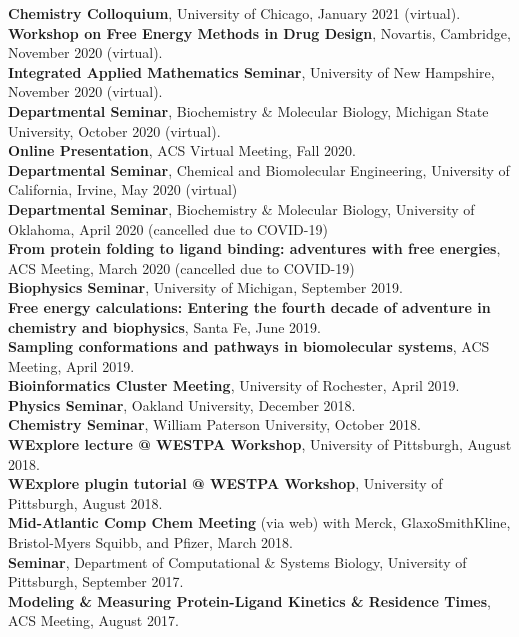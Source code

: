\documentclass[margin,line]{res}
\begin{document}
\begin{resume}
{\bf Chemistry Colloquium}, University of Chicago, January 2021 (virtual).\\
{\bf Workshop on Free Energy Methods in Drug Design}, Novartis, Cambridge, November 2020 (virtual).\\
{\bf Integrated Applied Mathematics Seminar}, University of New Hampshire, November 2020 (virtual).\\
{\bf Departmental Seminar}, Biochemistry \& Molecular Biology, Michigan State University, October 2020 (virtual).\\
{\bf Online Presentation}, ACS Virtual Meeting, Fall 2020.\\
{\bf Departmental Seminar}, Chemical and Biomolecular Engineering, University of California, Irvine, May 2020 (virtual) \\
{\bf Departmental Seminar}, Biochemistry \& Molecular Biology, University of Oklahoma, April 2020 (cancelled due to COVID-19) \\
{\bf From protein folding to ligand binding: adventures with free energies}, ACS Meeting, March 2020 (cancelled due to COVID-19) \\
{\bf Biophysics Seminar}, University of Michigan, September 2019.\\
{\bf Free energy calculations: Entering the fourth decade of adventure in chemistry and biophysics}, Santa Fe, June 2019.\\
{\bf Sampling conformations and pathways in biomolecular systems}, ACS Meeting, April 2019.\\
{\bf Bioinformatics Cluster Meeting}, University of Rochester, April 2019.\\
{\bf Physics Seminar}, Oakland University, December 2018.\\
{\bf Chemistry Seminar}, William Paterson University, October 2018.\\
{\bf WExplore lecture @ WESTPA Workshop}, University of Pittsburgh, August 2018.\\
{\bf WExplore plugin tutorial @ WESTPA Workshop}, University of Pittsburgh, August 2018.\\
{\bf Mid-Atlantic Comp Chem Meeting} (via web) with Merck, GlaxoSmithKline, Bristol-Myers Squibb, and Pfizer, March 2018. \\
{\bf Seminar}, Department of Computational \& Systems Biology, University of Pittsburgh, September 2017. \\
{\bf Modeling \& Measuring Protein-Ligand Kinetics \& Residence Times}, ACS Meeting, August 2017. \\

\end{resume}
\end{document}
